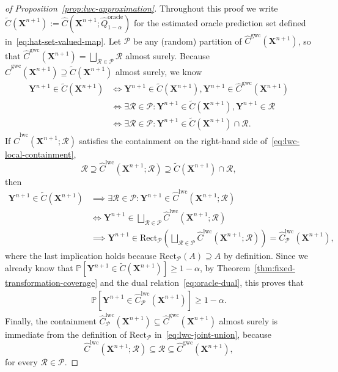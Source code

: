 \begin{proof}[of Proposition~\ref{prop:lwc-approximation}]
Throughout this proof we write $\tilde{C}(\mathbf{X}^{n+1}) := \hat{C}(\mathbf{X}^{n+1}; \hat{Q}^{\mathrm{oracle}}_{1-\alpha})$ for the estimated oracle prediction set defined in~\eqref{eq:hat-set-valued-map}.
Let $\mathcal{P}$ be any (random) partition of $\hat{C}^{\mathrm{gwc}}(\mathbf{X}^{n+1})$, so that $\hat{C}^{\mathrm{gwc}}(\mathbf{X}^{n+1}) = \bigsqcup_{\mathcal{R} \in \mathcal{P}}\mathcal{R}$ almost surely. Because $\hat{C}^{\mathrm{gwc}}(\mathbf{X}^{n+1}) \supseteq \tilde{C}(\mathbf{X}^{n+1})$ almost surely, we know
\begin{align*}
    \mathbf{Y}^{n+1} \in \tilde{C}(\mathbf{X}^{n+1})
    &\iff \mathbf{Y}^{n+1} \in \tilde{C}(\mathbf{X}^{n+1}), \mathbf{Y}^{n+1} \in \hat{C}^{\mathrm{gwc}}(\mathbf{X}^{n+1})\\
    &\iff \exists \mathcal{R} \in \mathcal{P}:  \mathbf{Y}^{n+1} \in \tilde{C}(\mathbf{X}^{n+1}), \mathbf{Y}^{n+1} \in \mathcal{R}\\
    &\iff \exists \mathcal{R} \in \mathcal{P}:  \mathbf{Y}^{n+1} \in \tilde{C}(\mathbf{X}^{n+1}) \cap \mathcal{R}.
\end{align*}
If $\hat{C}^\mathrm{lwc}(\mathbf{X}^{n+1}; \mathcal{R})$ satisfies the containment on the right-hand side of~\eqref{eq:lwc-local-containment},
\[
\mathcal{R}\supseteq \hat{C}^\mathrm{lwc}(\mathbf{X}^{n+1}; \mathcal{R}) \supseteq \tilde{C}(\mathbf{X}^{n+1}) \cap \mathcal{R},
\]
then
\begin{align*}
    \mathbf{Y}^{n+1} \in \tilde{C}(\mathbf{X}^{n+1}) &\implies \exists \mathcal{R}\in \mathcal{P}: \mathbf{Y}^{n+1} \in \hat{C}^\mathrm{lwc}(\mathbf{X}^{n+1}; \mathcal{R})\\
 &\iff \mathbf{Y}^{n+1} \in \bigsqcup_{\mathcal{R} \in \mathcal{P}}\hat{C}^\mathrm{lwc}(\mathbf{X}^{n+1}; \mathcal{R})\\
 &\implies \mathbf{Y}^{n+1} \in \mathrm{Rect}_{\mathcal{P}}\left(\bigsqcup_{\mathcal{R} \in \mathcal{P}}\hat{C}^\mathrm{lwc}(\mathbf{X}^{n+1}; \mathcal{R})\right) = \hat{C}^{\mathrm{lwc}}_{\mathcal{P}}(\mathbf{X}^{n+1}),
\end{align*}
where the last implication holds because $\mathrm{Rect}_{\mathcal{P}}(A) \supseteq A$ by definition.
Since we already know that $\mathbb{P}[\mathbf{Y}^{n+1} \in \tilde{C}(\mathbf{X}^{n+1})] \geq 1-\alpha$, by Theorem~\ref{thm:fixed-transformation-coverage} and the dual relation~\eqref{eq:oracle-dual}, this proves that
\begin{align*}
  \mathbb{P} \left[ \mathbf{Y}^{n+1} \in \hat{C}^\mathrm{lwc}_{\mathcal{P}}(\mathbf{X}^{n+1}) \right] \geq 1-\alpha.
\end{align*}
Finally, the containment $\hat{C}^\mathrm{lwc}_{\mathcal{P}}(\mathbf{X}^{n+1}) \subseteq \hat{C}^\mathrm{gwc}(\mathbf{X}^{n+1})$ almost surely is immediate from the definition of $\mathrm{Rect}_{\mathcal{P}}$ in~\eqref{eq:lwc-joint-union}, because 
\[
\hat{C}^\mathrm{lwc}(\mathbf{X}^{n+1}; \mathcal{R}) \subseteq \mathcal{R} \subseteq \hat{C}^\mathrm{gwc}(\mathbf{X}^{n+1}),
\]
for every $\mathcal{R} \in \mathcal{P}$.
\end{proof}

